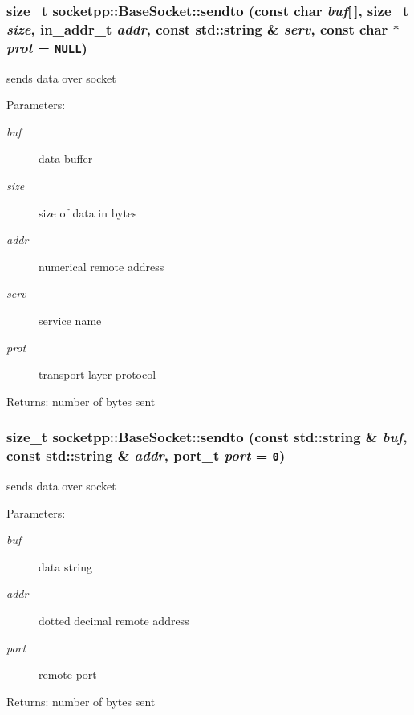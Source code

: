 \begin{CompactItemize}
{\subsubsection[{sendto}]{\setlength{\rightskip}{0pt plus 5cm}size\_\-t socketpp::BaseSocket::sendto (const char {\em buf}\mbox{[}$\,$\mbox{]}, \/  size\_\-t {\em size}, \/  in\_\-addr\_\-t {\em addr}, \/  const std::string \& {\em serv}, \/  const char $\ast$ {\em prot} = {\tt NULL})}}
\label{classsocketpp_1_1BaseSocket_0154d562be27c8b2aa074d5f6bb8ab03}


sends data over socket 

\begin{Desc}
\item[Parameters:]
\begin{description}
\item[{\em buf}]data buffer \item[{\em size}]size of data in bytes \item[{\em addr}]numerical remote address \item[{\em serv}]service name \item[{\em prot}]transport layer protocol \end{description}
\end{Desc}
\begin{Desc}
\item[Returns:]number of bytes sent \end{Desc}
\hypertarget{classsocketpp_1_1BaseSocket_8f98eff253e52ccf3463a0379a10caf2}{
\subsubsection[{sendto}]{\setlength{\rightskip}{0pt plus 5cm}size\_\-t socketpp::BaseSocket::sendto (const std::string \& {\em buf}, \/  const std::string \& {\em addr}, \/  {\bf port\_\-t} {\em port} = {\tt 0})}}
\label{classsocketpp_1_1BaseSocket_8f98eff253e52ccf3463a0379a10caf2}


sends data over socket 

\begin{Desc}
\item[Parameters:]
\begin{description}
\item[{\em buf}]data string \item[{\em addr}]dotted decimal remote address \item[{\em port}]remote port \end{description}
\end{Desc}
\begin{Desc}
\item[Returns:]number of bytes sent \end{Desc}
\hypertarget{classsocketpp_1_1BaseSocket_2b591cefe9fd8ac9f46ed7fbdd8caa82}{
}
\end{CompactItemize}
